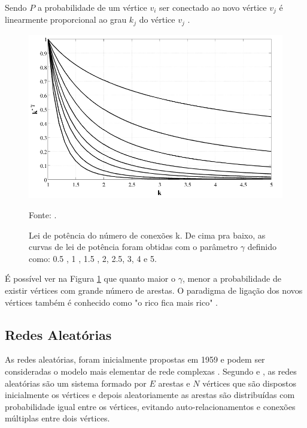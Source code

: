 Sendo $P$ a probabilidade de um vértice $v_i$ ser conectado ao novo vértice $v_j$ é linearmente proporcional ao grau $k_j$ do vértice $v_j$  \citet{lopes2011redes}.

 \begin{figure}[!htb]
	\caption{Lei de potência do número de conexões k. De cima pra baixo, as curvas de lei de potência foram obtidas com o parâmetro \(\gamma\) definido como: 0.5 , 1 , 1.5 , 2, 2.5, 3, 4 e 5.}
	\begin{center}
		\includegraphics[width=0.95\linewidth]{imagens/scalefree}
	\end{center}
	\small{Fonte: \citet{lopes2011redes}.}
	\label{fig:lei-potencia}
\end{figure} 
 
É possível ver na Figura \ref{fig:lei-potencia} que quanto maior o \(\gamma\), menor a probabilidade de existir vértices com grande número de arestas. O paradigma de ligação dos novos vértices também é conhecido como "o rico fica mais rico" \cite{costa}.
     
\subsection{Redes Aleatórias}
As redes aleatórias, foram inicialmente propostas em 1959 e podem ser consideradas o modelo mais elementar de rede complexas \cite{lopes2011redes, erdds1959random}.
Segundo \citet{Viana2007} e \citet{lopes2011redes}, as redes aleatórias são um sistema formado por $E$ arestas e $N$ vértices que são dispostos inicialmente os vértices e depois aleatoriamente as arestas são distribuídas com probabilidade igual entre os vértices, evitando auto-relacionamentos e conexões múltiplas entre dois vértices.


